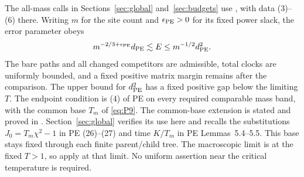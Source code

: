 The all-mass calls in Sections~\ref{sec:global} and~\ref{sec:budgets}
use \cite[Definition~6.1 and Proposition~6.6]{PE}, with data (3)--(6)
there. Writing $m$ for the site count and $\epsilon_{\rm PE}>0$ for
its fixed power slack, the error parameter obeys
\[
 m^{-2/3+\epsilon_{\rm PE}}d_{\rm PE}\lesssim E
 \le m^{-1/2}d_{\rm PE}^2.
\]
The bare paths and all changed competitors are admissible, total clocks
are uniformly bounded, and a fixed positive matrix margin remains after
the comparison. The upper bound for $d_{\rm PE}^2$ has a fixed positive
gap below the limiting $T$. The endpoint condition is (4) of PE on
every required comparable mass band, with the common base $T_m$ of
\eqref{eq:P9}. The common-base extension is stated and proved in
\cite[Appendix, ``A common prelimit temperature'']{PE}.
Section~\ref{sec:global} verifies its use here and recalls the
substitutions $J_0=T_m\chi^2-1$ in PE (26)--(27) and time $K/T_m$
in PE Lemmas~5.4--5.5. This base stays fixed through each finite
parent/child tree. The macroscopic limit is at the fixed
$T>1$, so \cite[Lemma~5.8 and Proposition~5.9]{PE} apply at that limit.
No uniform assertion near the critical temperature is required.


